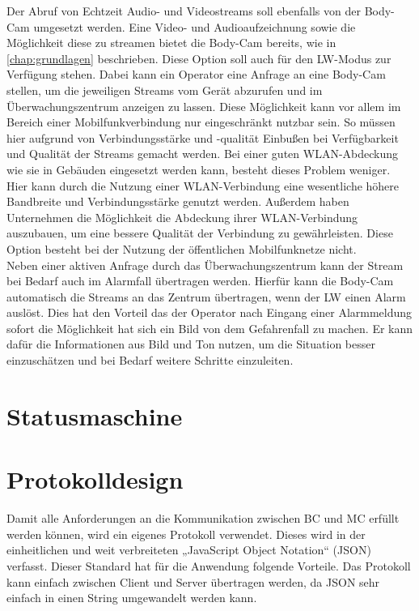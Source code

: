 \documentclass[thesis.tex]{subfiles}
\begin{document}
Der Abruf von Echtzeit Audio- und Videostreams soll ebenfalls von der Body-Cam umgesetzt werden.
Eine Video- und Audioaufzeichnung sowie die Möglichkeit diese zu streamen bietet die Body-Cam bereits, wie in \autoref{chap:grundlagen} beschrieben.
Diese Option soll auch für den LW-Modus zur Verfügung stehen.
Dabei kann ein Operator eine Anfrage an eine Body-Cam stellen, um die jeweiligen Streams vom Gerät abzurufen und im Überwachungszentrum anzeigen zu lassen.
Diese Möglichkeit kann vor allem im Bereich einer Mobilfunkverbindung nur eingeschränkt nutzbar sein.
So müssen hier aufgrund von Verbindungsstärke und -qualität Einbußen bei Verfügbarkeit und Qualität der Streams gemacht werden.
Bei einer guten WLAN-Abdeckung wie sie in Gebäuden eingesetzt werden kann, besteht dieses Problem weniger.
Hier kann durch die Nutzung einer WLAN-Verbindung eine wesentliche höhere Bandbreite und Verbindungsstärke genutzt werden.
Außerdem haben Unternehmen die Möglichkeit die Abdeckung ihrer WLAN-Verbindung auszubauen, um eine bessere Qualität der Verbindung zu gewährleisten.
Diese Option besteht bei der Nutzung der öffentlichen Mobilfunknetze nicht.
\\

Neben einer aktiven Anfrage durch das Überwachungszentrum kann der Stream bei Bedarf auch im Alarmfall übertragen werden.
Hierfür kann die Body-Cam automatisch die Streams an das Zentrum übertragen, wenn der LW einen Alarm auslöst.
Dies hat den Vorteil das der Operator nach Eingang einer Alarmmeldung sofort die Möglichkeit hat sich ein Bild von dem Gefahrenfall zu machen.
Er kann dafür die Informationen aus Bild und Ton nutzen, um die Situation besser einzuschätzen und bei Bedarf weitere Schritte einzuleiten.





\section{Statusmaschine}
\section{Protokolldesign}
Damit alle Anforderungen an die Kommunikation zwischen BC und MC erfüllt werden können, wird ein eigenes Protokoll verwendet.
Dieses wird in der einheitlichen und weit verbreiteten „JavaScript Object Notation“ (JSON) verfasst.
Dieser Standard hat für die Anwendung folgende Vorteile.
Das Protokoll kann einfach zwischen Client und Server übertragen werden, da JSON sehr einfach in einen String umgewandelt werden kann.
\\
\end{document}
